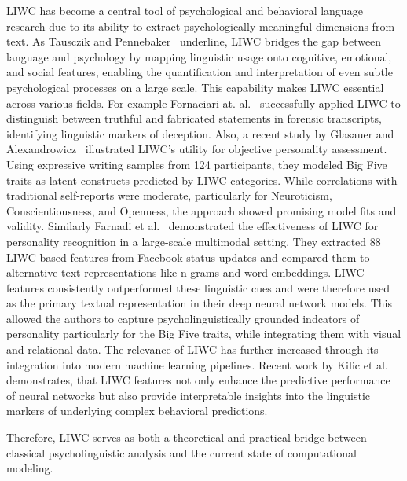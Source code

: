 LIWC has become a central tool of psychological and behavioral language research due to its ability to extract psychologically meaningful dimensions from text. As Tausczik and Pennebaker~\cite{tausczik2010psychological} underline, LIWC bridges the gap between language and psychology by mapping linguistic usage onto cognitive, emotional, and social features, enabling the quantification and interpretation of even subtle psychological processes on a large scale. This capability makes LIWC essential across various fields. For example Fornaciari at. al.~\cite{fornaciari2013automatic} successfully applied LIWC to distinguish between truthful and fabricated statements in forensic transcripts, identifying linguistic markers of deception. Also, a recent study by Glasauer and Alexandrowicz~\cite{glasauer2022bigfive} illustrated LIWC’s utility for objective personality assessment. Using expressive writing samples from 124 participants, they modeled Big Five traits as latent constructs predicted by LIWC categories. While correlations with traditional self-reports were moderate, particularly for Neuroticism, Conscientiousness, and Openness, the approach showed promising model fits and validity. Similarly Farnadi et al.~\cite{farnadi2018user} demonstrated the effectiveness of LIWC for personality recognition in a large-scale multimodal setting. They extracted 88 LIWC-based features from Facebook status updates and compared them to alternative text representations like n-grams and word embeddings. LIWC features consistently outperformed these linguistic cues and were therefore used as the primary textual representation in their deep neural network models. This allowed the authors to capture psycholinguistically grounded indcators of personality particularly for the Big Five traits, while integrating them with visual and relational data. The relevance of LIWC has further increased through its integration into modern machine learning pipelines. Recent work by Kilic et al.~\cite{yakut-kilic-pan-2022-incorporating} demonstrates, that LIWC  features not only enhance the predictive performance of neural networks but also provide interpretable insights into the linguistic markers of underlying complex behavioral predictions.

Therefore, LIWC serves as both a theoretical and practical bridge between classical psycholinguistic analysis and the current state of computational modeling. 


